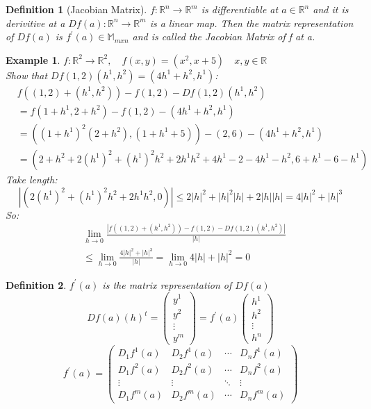 \documentclass[12pt]{article}
\def\MM{\mathbb{M}}
\def\RR{\mathbb{R}}
\newtheorem{definition}{Definition}[section]
\newtheorem{example}{Example}[section]
\begin{document}
\begin{definition}[Jacobian Matrix]\label{D:Jacobian Matrix}
$f:\RR^{n} \rightarrow \RR^{m}$ is differentiable at $a \in \RR^{n}$ and it is derivitive at a $Df(a):\RR^{n} \rightarrow \RR^{m}$ is a linear map. Then the matrix representation of $Df(a)$ is $f^{'}(a) \in \MM_{mxn}$ and is called the Jacobian Matrix of f at a.
\end{definition}

\begin{example}\label{Df example}
$f:\RR^{2} \rightarrow \RR^{2}, \quad f(x,y)=(x^{2},x+5) \quad x,y \in \RR$\\
Show that $Df(1,2)(h^{1}, h^{2})=(4h^{1} +  h^{2}, h^{1})$:
\begin{align*}
&f((1,2) +(h^{1}, h^{2})) - f(1,2) -Df(1,2)(h^{1}, h^{2})\\
&= f(1+h^{1}, 2+ h^{2}) - f(1,2) - (4h^{1}+ h^{2}, h^{1})\\
&=((1+h^{1})^{2}(2+ h^{2}), (1+h^{1} +5)) - (2,6)  - (4h^{1}+ h^{2}, h^{1})\\
&=(2+ h^{2} + 2(h^{1})^{2} +(h^{1})^{2}h^{2} + 2h^{1}h^{2} + 4h^{1} -2 -4h^{1} -h^{2}, 6+h^{1} - 6 -h^{1})
\end{align*}
\textrm{Take length:}
\[|(2(h^{1})^{2} +(h^{1})^{2}h^{2} + 2h^{1}h^{2}, 0)| \leq 2|h|^{2} +|h|^{2}|h| + 2|h||h| = 4|h|^{2} + |h|^{3}\]
\textrm{So:}
\begin{align*}
&\lim_{h \to 0}\frac{|f((1,2) +(h^{1}, h^{2})) - f(1,2) -Df(1,2)(h^{1}, h^{2})|}{|h|}\\
& \leq
\lim_{h \to 0}\frac{4|h|^{2} + |h|^{3}}{|h|} =  \lim_{h \to 0}4|h| + |h|^{2}=0
\end{align*}
\end{example}

\begin{definition}
$f^{'}(a)$ is the matrix representation of $Df(a)$
\[Df(a)(h)^{t}= \left(\! \begin{array}{c} y^{1} \\ y^{2}\\ \vdots\\ y^{m} \end{array}\! \right) = f^{'}(a) \left(\! \begin{array}{c} h^{1} \\ h^{2}\\ \vdots\\ h^{n} \end{array}\! \right) \]
\[ f^{'}(a) = \begin{pmatrix}
  D_{1}f^{1}(a) & D_{2}f^{1}(a) & \cdots &D_{n}f^{1}(a) \\
  D_{1}f^{2}(a) & D_{2}f^{2}(a) & \cdots & D_{n}f^{2}(a) \\
  \vdots  & \vdots  & \ddots & \vdots  \\
  D_{1}f^{m}(a) & D_{2}f^{m}(a) & \cdots & D_{n}f^{m}(a)
 \end{pmatrix}\]
\end{definition}
\end{document}
